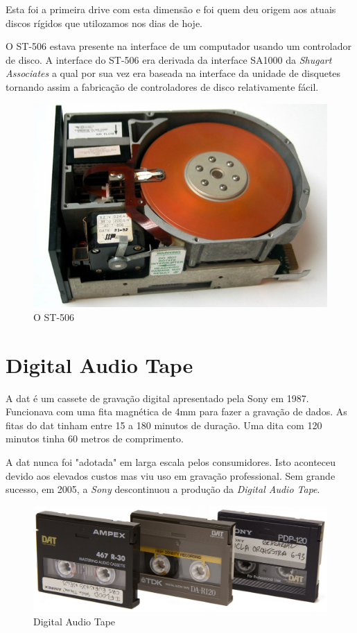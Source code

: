 \documentclass{report}
\begin{document}
	Esta foi a primeira drive com esta dimensão e foi quem deu origem aos atuais discos rígidos que utilozamos nos dias de hoje.
\vspace{1mm}

	O ST-506 estava presente na interface de um computador usando um controlador de disco. A interface do ST-506 era derivada da interface SA1000 da \textit{Shugart Associates}  a qual por sua vez era baseada na interface da unidade de disquetes tornando assim a fabricação de controladores de disco relativamente fácil.
\vspace{1mm}

	\begin{figure} [h]
		\centering
		\includegraphics[scale=0.3]{st-506.jpg}
		\caption{O ST-506}
	\end{figure}		
\newpage

		\section{Digital Audio Tape}
	A \ac{dat} é um cassete de gravação digital apresentado pela Sony em 1987.	
	Funcionava com uma fita magnética de 4mm para fazer a gravação de dados. As fitas do \ac{dat} tinham entre 15 a 180 minutos de duração. Uma dita com 120 minutos tinha 60 metros de comprimento.
	
	A \ac{dat} nunca foi "adotada" em larga escala pelos consumidores. Isto aconteceu devido aos elevados custos mas viu uso em gravação professional.
	Sem grande sucesso, em 2005, a \textit{Sony} descontinuou a produção da \textit{Digital Audio Tape}.
	 
	
	\begin{figure} [h]
		\centering
		\includegraphics[scale=0.3]{dat.jpg}
		\caption{Digital Audio Tape}
	\end{figure}
\end{document}
